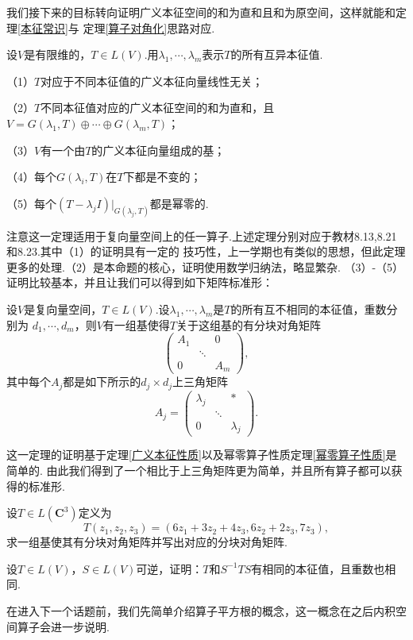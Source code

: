我们接下来的目标转向证明广义本征空间的和为直和且和为原空间，这样就能和定理\ref{本征常识}与
定理\ref{算子对角化}思路对应.
\begin{theorem}\label{广义本征性质}
	设$V$是有限维的，$T\in L(V)$.用$\lambda_1,\cdots,\lambda_m$表示$T$的所有互异本征值.

	\textup{（1）}$T$对应于不同本征值的广义本征向量线性无关；

	\textup{（2）}$T$不同本征值对应的广义本征空间的和为直和，且$V=G(\lambda_1,T)\oplus\cdots\oplus
	G(\lambda_m,T)$；

	\textup{（3）}$V$有一个由$T$的广义本征向量组成的基；

	\textup{（4）}每个$G(\lambda_i,T)$在$T$下都是不变的；

	\textup{（5）}每个$(T-\lambda_j I)|_{G(\lambda_j,T)}$都是幂零的.
\end{theorem}
注意这一定理适用于复向量空间上的任一算子.上述定理分别对应于教材8.13,8.21和8.23.其中（1）的证明具有一定的
技巧性，上一学期也有类似的思想，但此定理更多的处理.（2）是本命题的核心，证明使用数学归纳法，略显繁杂.
（3）-（5）证明比较基本，并且让我们可以得到如下矩阵标准形：
\begin{theorem}
	设$V$是复向量空间，$T\in L(V)$.设$\lambda_1,\cdots,\lambda_m$是$T$的所有互不相同的本征值，重数分别为
	$d_1,\cdots,d_m$，则$V$有一组基使得$T$关于这组基的有分块对角矩阵
	$$\begin{pmatrix}
		A_1 &  & 0 \\  & \ddots &  \\ 0 &  & A_m
	\end{pmatrix},$$其中每个$A_j$都是如下所示的$d_j\times d_j$上三角矩阵
	$$A_j=\begin{pmatrix}
		\lambda_j &  & * \\  & \ddots &  \\ 0 &  & \lambda_j
	\end{pmatrix}.$$
\end{theorem}
这一定理的证明基于定理\ref{广义本征性质}以及幂零算子性质定理\ref{幂零算子性质}是简单的.
由此我们得到了一个相比于上三角矩阵更为简单，并且所有算子都可以获得的标准形.
\begin{example}
	设$T\in L(\mathbf{C}^3)$定义为
	$$T(z_1,z_2,z_3)=(6z_1+3z_2+4z_3,6z_2+2z_3,7z_3),$$求一组基使其有分块对角矩阵并写出对应的分块对角矩阵.
\end{example}
\begin{example}
	设$T\in L(V)$，$S\in L(V)$可逆，证明：$T$和$S^{-1}TS$有相同的本征值，且重数也相同.
\end{example}
在进入下一个话题前，我们先简单介绍算子平方根的概念，这一概念在之后内积空间算子会进一步说明.
